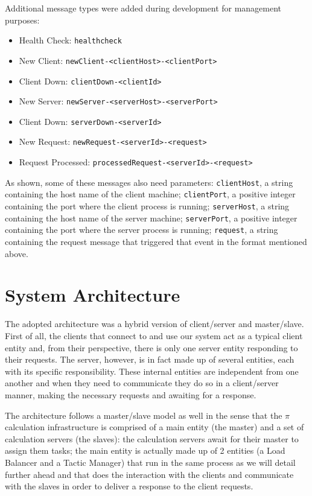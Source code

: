 \documentclass[12pt]{article}
\begin{document}
Additional message types were added during development for management purposes:
\vspace{-10pt}
\begin{itemize}[noitemsep]
  \item Health Check: \texttt{healthcheck}
  \item New Client: \texttt{newClient-<clientHost>-<clientPort>}
  \item Client Down: \texttt{clientDown-<clientId>}
  \item New Server: \texttt{newServer-<serverHost>-<serverPort>}
  \item Client Down: \texttt{serverDown-<serverId>}
  \item New Request: \texttt{newRequest-<serverId>-<request>}
  \item Request Processed: \texttt{processedRequest-<serverId>-<request>}
\end{itemize}
\vspace{-10pt}
As shown, some of these messages also need parameters: 
\texttt{clientHost}, a string containing the host name of the client machine; 
\texttt{clientPort}, a positive integer containing the port where the client process is running; 
\texttt{serverHost}, a string containing the host name of the server machine; 
\texttt{serverPort}, a positive integer containing the port where the server process is running; 
\texttt{request}, a string containing the request message that triggered that event in the format mentioned above.

\newpage
\section{System Architecture} \label{architecture} %

The adopted architecture was a hybrid version of client/server and master/slave.
First of all, the clients that connect to and use our system act as a typical client entity and, from their perspective, there is only one server entity 
responding to their requests.
The server, however, is in fact made up of several entities, each with its specific responsibility.
These internal entities are independent from one another and when they need to communicate they do so in a client/server manner, making the necessary requests 
and awaiting for a response.

The architecture follows a master/slave model as well in the sense that the $\pi$ calculation infrastructure is comprised of a main entity (the master) and a 
set of calculation servers (the slaves): the calculation servers await for their master to assign them tasks; the main entity is actually made up of 2 
entities (a Load Balancer and a Tactic Manager) that run in the same process as we will detail further ahead and that does the interaction with the clients and 
communicate with the slaves in order to deliver a response to the client requests.
\end{document}
